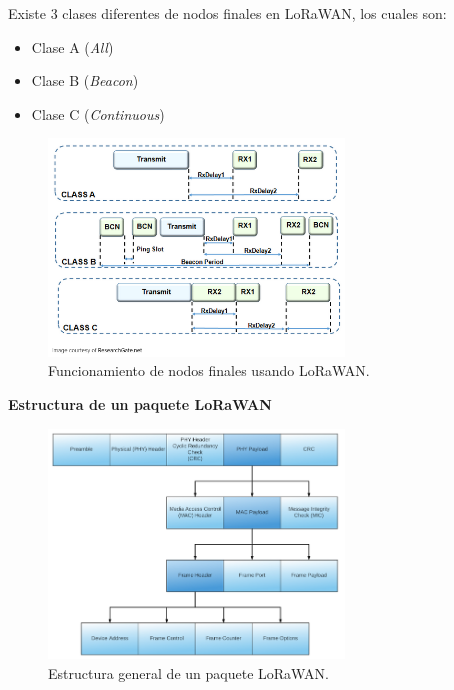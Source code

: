 \documentclass[12pt]{article}
\begin{document}
	\noindent Existe 3 clases diferentes de nodos finales en LoRaWAN, los cuales son:
	
	\begin{itemize}
		\item Clase A (\textit{All})
		\item Clase B (\textit{Beacon})
		\item Clase C (\textit{Continuous})
	\end{itemize}
	
		\begin{figure}[h]
		\begin{center}
			\includegraphics[width=0.7\textwidth]{img/endDevices.png}
			\caption{Funcionamiento de nodos finales usando LoRaWAN.}
		\end{center}
	\end{figure}
	
	\pagebreak
	
	\noindent \textbf{Estructura de un paquete LoRaWAN}
	
	\begin{figure}[h]
	\begin{center}
			\includegraphics[width=0.7\textwidth]{img/lora_phyLayer_packetFormat.png}
			\caption{Estructura general de un paquete LoRaWAN.}
	\end{center}
	\end{figure}
	
\end{document}
